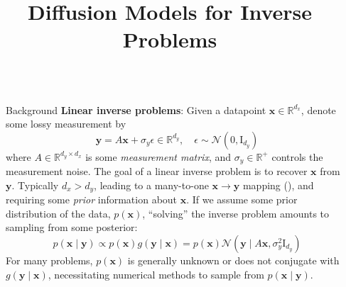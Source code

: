 \documentclass[final]{beamer}
\title{Diffusion Models for Inverse Problems}
\newlength{\sepwidth}
\newlength{\colwidth}
\newcommand{\separatorcolumn}{\begin{column}{\sepwidth}\end{column}}
\begin{document}
\begin{frame}[t]
\begin{columns}[t]
\separatorcolumn

\begin{column}{\colwidth}

    \begin{block}{Background}
        \textbf{Linear inverse problems}: Given  a datapoint $\mathbf{x} \in \mathbb{R}^{d_x}$,
        denote some lossy measurement by
        $$
        \mathbf{y} = A\mathbf{x} + \sigma_y\epsilon \in \mathbb{R}^{d_y},\quad \epsilon \sim \mathcal{N}\left(0, \mathrm{I}_{d_y}\right)
        $$
        where
        $A \in \mathbb{R}^{d_y \times d_x}$ is some \emph{measurement matrix},
        and $\sigma_y \in \mathbb{R}^+$ controls the measurement noise. The goal of a linear
        inverse problem is to recover $\mathbf{x}$ from $\mathbf{y}$.
        Typically $d_x > d_y$, leading to a many-to-one $\mathbf{x} \rightarrow \mathbf{y}$ mapping
        (\cite{chungDiffusionPosteriorSampling2022}), and requiring some \emph{prior} information about $\mathbf{x}$.
        If we assume some prior distribution of the data, $p(\mathbf{x})$, ``solving'' the inverse problem
        amounts to sampling from some posterior:
        $$
        p(\mathbf{x} \mid \mathbf{y}) \propto p(\mathbf{x})g(\mathbf{y} \mid \mathbf{x}) = p(\mathbf{x})\mathcal{N}\left(\mathbf{y} \mid A\mathbf{x}, \sigma^2_y\mathrm{I}_{d_y}\right)
        $$
        For many problems, $p(\mathbf{x})$ is generally unknown or does not conjugate with $g(\mathbf{y} \mid \mathbf{x})$,
        necessitating numerical methods to sample from $p(\mathbf{x} \mid \mathbf{y})$.


\end{block}
\end{column}
\end{columns}
\end{frame}
\end{document}
